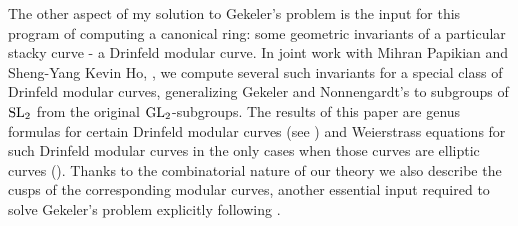 \documentclass[12pt]{amsart}
\begin{document}
	 The other aspect of my solution to Gekeler's problem is the input for this program of computing a canonical ring: some geometric invariants of a particular stacky curve - a Drinfeld modular curve. In joint work with Mihran Papikian and Sheng-Yang Kevin Ho, \cite{Franklin-Ho-Papikian-DrinfeldCurves-SL}, we compute several such invariants for a special class of Drinfeld modular curves, generalizing Gekeler and Nonnengardt's \cite{Gekeler-Nonnengardt-BruhatTitsTrees} to subgroups of $\mathrm{SL}_2$ from the original $\mathrm{GL}_2$-subgroups. The results of this paper are genus formulas for certain Drinfeld modular curves (see \cite[Section $3$]{Franklin-Ho-Papikian-DrinfeldCurves-SL}) and Weierstrass equations for such Drinfeld modular curves in the only cases when those curves are elliptic curves (\cite[Section $4$]{Franklin-Ho-Papikian-DrinfeldCurves-SL}). Thanks to the combinatorial nature of our theory we also describe the cusps of the corresponding modular curves, another essential input required to solve Gekeler's problem explicitly following \cite{Franklin-geometry-Drinfeld-modular-forms}.
\end{document}

